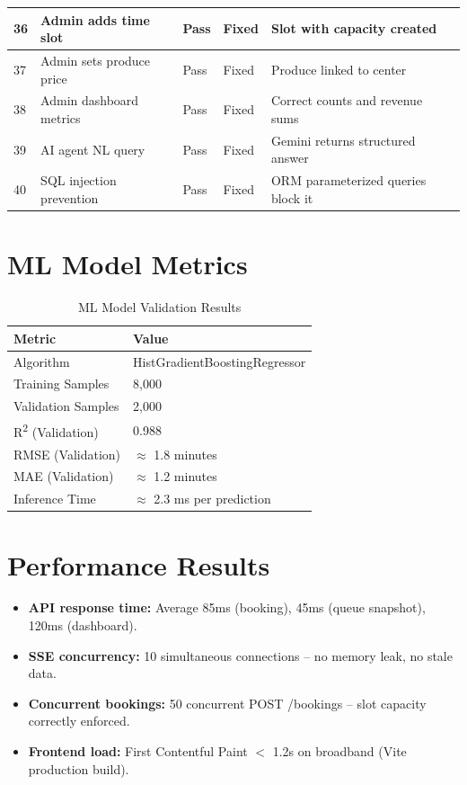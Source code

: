 \begin{longtable}{|p{0.4cm}|p{3.8cm}|p{1.6cm}|p{1.5cm}|p{5.8cm}|}
36 & Admin adds time slot                 & Pass & Fixed & Slot with capacity created \\ \hline
37 & Admin sets produce price             & Pass & Fixed & Produce linked to center \\ \hline
38 & Admin dashboard metrics              & Pass & Fixed & Correct counts and revenue sums \\ \hline
39 & AI agent NL query                    & Pass & Fixed & Gemini returns structured answer \\ \hline
40 & SQL injection prevention             & Pass & Fixed & ORM parameterized queries block it \\ \hline
\end{longtable}

\section{ML Model Metrics}

\begin{table}[h!]
\centering
\caption{ML Model Validation Results}
\label{tab:ml-metrics}
\renewcommand{\arraystretch}{1.2}
\begin{tabular}{|p{5.5cm}|p{7cm}|}
\hline
\textbf{Metric} & \textbf{Value} \\ \hline
Algorithm & HistGradientBoostingRegressor \\ \hline
Training Samples & 8,000 \\ \hline
Validation Samples & 2,000 \\ \hline
R\textsuperscript{2} (Validation) & 0.988 \\ \hline
RMSE (Validation) & $\approx$ 1.8 minutes \\ \hline
MAE (Validation) & $\approx$ 1.2 minutes \\ \hline
Inference Time & $\approx$ 2.3 ms per prediction \\ \hline
\end{tabular}
\end{table}

\section{Performance Results}
\begin{itemize}
  \item \textbf{API response time:} Average 85ms (booking), 45ms (queue snapshot), 120ms (dashboard).
  \item \textbf{SSE concurrency:} 10 simultaneous connections -- no memory leak, no stale data.
  \item \textbf{Concurrent bookings:} 50 concurrent POST /bookings -- slot capacity correctly enforced.
  \item \textbf{Frontend load:} First Contentful Paint $<$ 1.2s on broadband (Vite production build).
\end{itemize}

